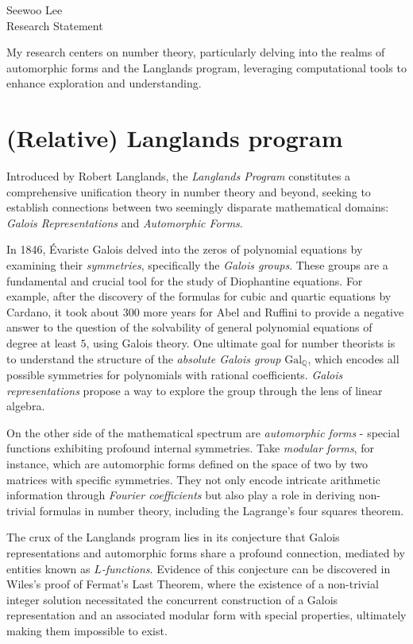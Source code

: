 \documentclass[12pt]{article}
\begin{document}
\noindent Seewoo Lee \\
Research Statement \\
\bigskip



My research centers on number theory, particularly delving into the realms of automorphic forms and the Langlands program, leveraging computational tools to enhance exploration and understanding.


\section*{(Relative) Langlands program}



Introduced by Robert Langlands, the \emph{Langlands Program} constitutes a comprehensive unification theory in number theory and beyond, seeking to establish connections between two seemingly disparate mathematical domains: \emph{Galois Representations} and \emph{Automorphic Forms}.


In 1846, Évariste Galois delved into the zeros of polynomial equations by examining their \emph{symmetries}, specifically the \emph{Galois groups}.
These groups are a fundamental and crucial tool for the study of Diophantine equations.
For example, after the discovery of the formulas for cubic and quartic equations by Cardano, it took about 300 more years for Abel and Ruffini to provide a negative answer to the question of the solvability of general polynomial equations of degree at least $5$, using Galois theory.
One ultimate goal for number theorists is to understand the structure of the \emph{absolute Galois group} $\mathrm{Gal}_{\mathbb{Q}}$, which encodes all possible symmetries for polynomials with rational coefficients.
\emph{Galois representations} propose a way to explore the group through the lens of linear algebra.


On the other side of the mathematical spectrum are \emph{automorphic forms} - special functions exhibiting profound internal symmetries.
Take \emph{modular forms}, for instance, which are automorphic forms defined on the space of two by two matrices with specific symmetries.
They not only encode intricate arithmetic information through \emph{Fourier coefficients} but also play a role in deriving non-trivial formulas in number theory, including the Lagrange's four squares theorem.


The crux of the Langlands program lies in its conjecture that Galois representations and automorphic forms share a profound connection, mediated by entities known as \emph{$L$-functions}.
Evidence of this conjecture can be discovered in Wiles's  proof of Fermat's Last Theorem, where the existence of a non-trivial integer solution necessitated the concurrent construction of a Galois representation and an associated modular form with special properties, ultimately making them impossible to exist.
\end{document}
